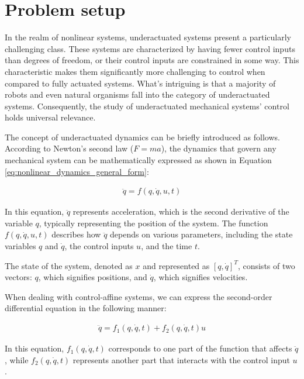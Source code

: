 \section{Problem setup}
In the realm of nonlinear systems, underactuated systems\cite{liu2013survey} present a particularly challenging class. These systems are characterized by having fewer control inputs than degrees of freedom, or their control inputs are constrained in some way. This characteristic makes them significantly more challenging to control when compared to fully actuated systems. What's intriguing is that a majority of robots and even natural organisms fall into the category of underactuated systems. Consequently, the study of underactuated mechanical systems' control holds universal relevance.

The concept of underactuated dynamics can be briefly introduced as follows. According to Newton's second law (\( F = ma \)), the dynamics that govern any mechanical system can be mathematically expressed as shown in Equation \ref{eq:nonlinear_dynamics_general_form}:

\begin{align}
    \ddot{q} = f(q, \dot{q}, u, t)
    \label{eq:nonlinear_dynamics_general_form}
\end{align}

In this equation, \( \ddot{q} \) represents acceleration, which is the second derivative of the variable \( q \), typically representing the position of the system. The function \( f(q, \dot{q}, u, t) \) describes how \( \ddot{q} \) depends on various parameters, including the state variables \( q \) and \( \dot{q} \), the control inputs \( u \), and the time \( t \).

The state of the system, denoted as \( x \) and represented as \( [q, \dot{q}]^T \), consists of two vectors: \( q \), which signifies positions, and \( \dot{q} \), which signifies velocities.

When dealing with control-affine systems, we can express the second-order differential equation in the following manner:

\begin{align}
    \ddot{q} = f_1(q, \dot{q}, t) + f_2(q, \dot{q}, t)u
    \label{eq:nonlinear_dynamics_control_form}
\end{align}

In this equation, \( f_1(q, \dot{q}, t) \) corresponds to one part of the function that affects \( \ddot{q} \), while \( f_2(q, \dot{q}, t) \) represents another part that interacts with the control input \( u \).

